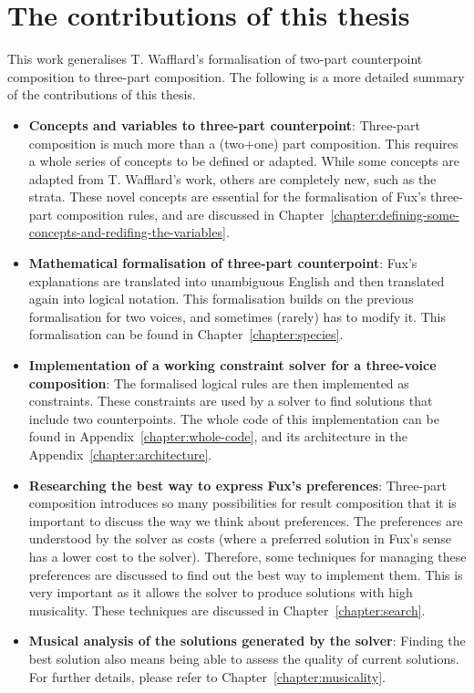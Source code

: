 \section{The contributions of this thesis}
This work generalises T. Wafflard's formalisation of two-part counterpoint composition to three-part composition. The following is a more detailed summary of the contributions of this thesis. 
\begin{itemize}
    \item \textbf{Concepts and variables to three-part counterpoint}:
    Three-part composition is much more than a (two+one) part composition. This requires a whole series of concepts to be defined or adapted. While some concepts are adapted from T. Wafflard's work, others are completely new, such as the strata. These novel concepts are essential for the formalisation of Fux's three-part composition rules, and are discussed in Chapter~\ref{chapter:defining-some-concepts-and-redifing-the-variables}.
    \item \textbf{Mathematical formalisation of three-part counterpoint}: Fux's explanations are translated into unambiguous English and then translated again into logical notation. This formalisation builds on the previous formalisation for two voices, and sometimes (rarely) has to modify it. This formalisation can be found in Chapter~\ref{chapter:species}.
    \item \textbf{Implementation of a working constraint solver for a three-voice composition}: The formalised logical rules are then implemented as constraints. These constraints are used by a solver to find solutions that include two counterpoints. The whole code of this implementation can be found in Appendix~\ref{chapter:whole-code}, and its architecture in the Appendix~\ref{chapter:architecture}.
    \item \textbf{Researching the best way to express Fux's preferences}: Three-part composition introduces so many possibilities for result composition that it is important to discuss the way we think about preferences. The preferences are understood by the solver as costs (where a preferred solution in Fux's sense has a lower cost to the solver). Therefore, some techniques for managing these preferences are discussed to find out the best way to implement them. This is very important as it allows the solver to produce solutions with high musicality. These techniques are discussed in Chapter~\ref{chapter:search}.
    \item \textbf{Musical analysis of the solutions generated by the solver}: Finding the best solution also means being able to assess the quality of current solutions. For further details, please refer to Chapter~\ref{chapter:musicality}. 

\end{itemize}
